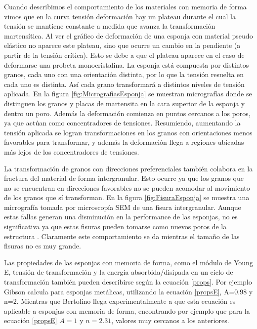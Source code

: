 \documentclass[a4paper,12pt,fleqn,twoside,openany]{book}
\begin{document}
Cuando describimos el comportamiento de los materiales con memoria de forma vimos que en la curva tensión deformación hay un plateau durante el cual la tensión se 
mantiene constante a medida que avanza la transformación martensítica. Al ver el gráfico de deformación de una esponja con material pseudo elástico no aparece este plateau, 
sino que ocurre un cambio en la pendiente (a partir de la tensión crítica). Esto se debe a que el plateau aparece en el caso de deformarse una probeta monocristalina. 
La esponja está compuesta por distintos granos, cada uno con una orientación distinta, por lo que la tensión resuelta en cada uno es distinta. Así cada grano transformará 
a distintos niveles de tensión aplicada. En la figura \ref{fig:MicrografiasEsponja} se muestran micrografías donde se distinguen los granos y placas de martensita en la cara superior de la esponja y dentro un poro. Además la deformación comienza en puntos cercanos a los poros, ya que actúan como concentradores de tensiones. Resumiendo, 
aumentando la tensión aplicada se logran transformaciones en los granos con orientaciones menos favorables para transformar, y además la deformación llega a regiones ubicadas más lejos 
de los concentradores de tensiones.

La transformación de granos con direcciones preferenciales también colabora en la fractura del material de forma intergranular. Esto ocurre ya que los granos que no se encuentran
en direcciones favorables no se pueden acomodar al movimiento de los granos que sí transforman. En la figura \ref{fig:FisuraEsponja} se muestra una micrografía tomada por microscopía SEM de una fisura intergranular. Aunque estas fallas generan una disminución en la performance de las esponjas,
no es significativa ya que estas fisuras pueden tomarse como nuevos poros de la estructura \cite{bertolino2010}. Claramente este comportamiento se da mientras el tamaño de las fisuras no es muy 
grande.

Las propiedades de las esponjas con memoria de forma, como el módulo de Young E, tensión de transformación y la energía absorbida/disipada en un ciclo de 
transformación también pueden describirse según la ecuación \ref{props}. Por ejemplo Gibson \cite{gibson} calcula para esponjas metálicas, utilizando la 
ecuación \ref{propsE}, A=0.98 y n=2. Mientras que Bertolino \cite{bertolino2011} llega experimentalmente a que esta ecuación es aplicable a esponjas 
con memoria de forma, encontrando por ejemplo que para la ecuación \ref{propsE} $A=1$ y $n=2.31$, valores muy cercanos a los anteriores.
\end{document}
